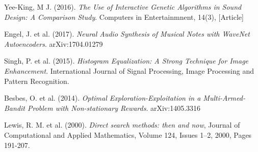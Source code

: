\documentclass[11pt, oneside]{report}   	%
\begin{document}
{\begin{thebibliography}{9}
Yee-King, M J. (2016). \emph{The Use of Interactive Genetic Algorithms in Sound Design: A Comparison Study}. Computers in Entertainmnent, 14(3), [Article]

 Engel, J. et al. (2017). \emph{Neural Audio Synthesis of Musical Notes with WaveNet Autoencoders}. arXiv:1704.01279 

Singh, P. et al. (2015). \emph{Histogram Equalization: A Strong Technique for Image Enhancement}. International Journal of Signal Processing, Image Processing and Pattern Recognition. %

Besbes, O. et al. (2014). \emph{Optimal Exploration-Exploitation in a Multi-Armed-Bandit Problem with Non-stationary Rewards}.	arXiv:1405.3316

Lewis, R. M. et al. (2000). \emph{Direct search methods: then and now},
Journal of Computational and Applied Mathematics,
Volume 124, Issues 1–2,
2000,
Pages 191-207.

\end{thebibliography}
\pagebreak

}
\end{document}
